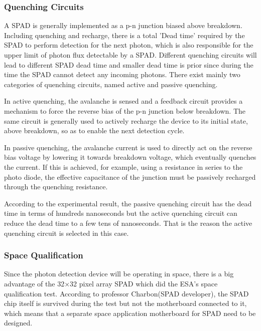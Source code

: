 \subsubsection{Quenching Circuits}
\label{AQC}
A \acs{SPAD} is generally implemented as a p-n junction biased above breakdown. Including quenching and recharge, there is a total 'Dead time' required by the \acs{SPAD} to perform detection for the next photon, which is also responsible for the upper limit of photon flux detectable by a \acs{SPAD}. Different quenching circuits will lead to different \acs{SPAD} dead time and smaller dead time is prior since during the time the \acs{SPAD} cannot detect any incoming photons. There exist mainly two categories of quenching circuits, named active and passive quenching. 

In active quenching, the avalanche is sensed and a feedback circuit provides a mechanism to force the reverse bias of the p-n junction below breakdown. The same circuit is generally used to actively recharge the device to its initial state, above breakdown, so as to enable the next detection cycle.

In passive quenching, the avalanche current is used to directly act on the reverse bias voltage by lowering it towards breakdown voltage, which eventually quenches the current. If this is achieved, for example, using a resistance in series to the photo diode, the effective capacitance of the junction must be passively recharged through the quenching resistance.

According to the experimental result, the passive quenching circuit has the dead time in terms of hundreds nanoseconds but the active quenching circuit can reduce the dead time to a few tens of nanoseconds. That is the reason the active quenching circuit is selected in this case.

\subsubsection{Space Qualification}
\label{SQ}
Since the photon detection device will be operating in space, there is a big advantage of the 32$\times$32 pixel array \acs{SPAD} which did the \acs{ESA}'s space qualification test. According to professor Charbon(\acs{SPAD} developer), the \acs{SPAD} chip itself is survived during the test but not the motherboard connected to it, which means that a separate space application motherboard for \acs{SPAD} need to be designed.

